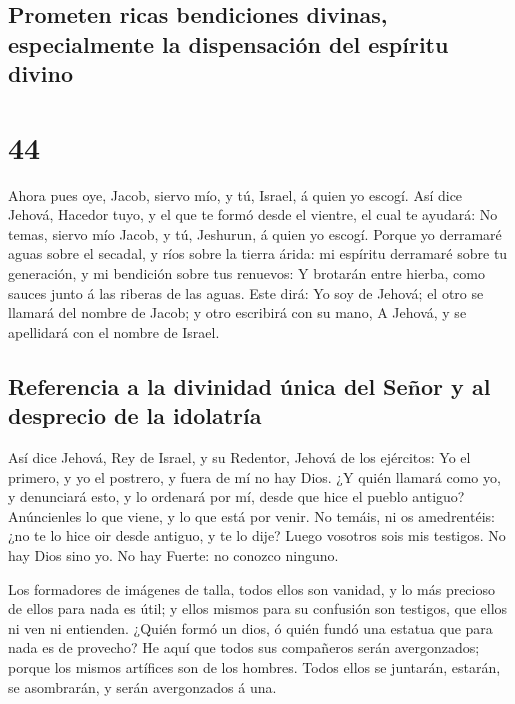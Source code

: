 \hypertarget{prometen-ricas-bendiciones-divinas-especialmente-la-dispensaciuxf3n-del-espuxedritu-divino}{%
\subsection{Prometen ricas bendiciones divinas, especialmente la
dispensación del espíritu
divino}\label{prometen-ricas-bendiciones-divinas-especialmente-la-dispensaciuxf3n-del-espuxedritu-divino}}

\hypertarget{section-43}{%
\section{44}\label{section-43}}

 Ahora pues oye, Jacob, siervo mío, y tú, Israel, á quien yo
escogí.  Así dice Jehová, Hacedor tuyo, y el que te formó
desde el vientre, el cual te ayudará: No temas, siervo mío Jacob, y tú,
Jeshurun, á quien yo escogí.  Porque yo derramaré aguas
sobre el secadal, y ríos sobre la tierra árida: mi espíritu derramaré
sobre tu generación, y mi bendición sobre tus renuevos:  Y
brotarán entre hierba, como sauces junto á las riberas de las aguas.
 Este dirá: Yo soy de Jehová; el otro se llamará del nombre
de Jacob; y otro escribirá con su mano, A Jehová, y se apellidará con el
nombre de Israel.

\hypertarget{referencia-a-la-divinidad-uxfanica-del-seuxf1or-y-al-desprecio-de-la-idolatruxeda}{%
\subsection{Referencia a la divinidad única del Señor y al desprecio de
la
idolatría}\label{referencia-a-la-divinidad-uxfanica-del-seuxf1or-y-al-desprecio-de-la-idolatruxeda}}

 Así dice Jehová, Rey de Israel, y su Redentor, Jehová de
los ejércitos: Yo el primero, y yo el postrero, y fuera de mí no hay
Dios.  ¿Y quién llamará como yo, y denunciará esto, y lo
ordenará por mí, desde que hice el pueblo antiguo? Anúncienles lo que
viene, y lo que está por venir.  No temáis, ni os
amedrentéis: ¿no te lo hice oir desde antiguo, y te lo dije? Luego
vosotros sois mis testigos. No hay Dios sino yo. No hay Fuerte: no
conozco ninguno.

 Los formadores de imágenes de talla, todos ellos son
vanidad, y lo más precioso de ellos para nada es útil; y ellos mismos
para su confusión son testigos, que ellos ni ven ni entienden.
 ¿Quién formó un dios, ó quién fundó una estatua que para
nada es de provecho?  He aquí que todos sus compañeros
serán avergonzados; porque los mismos artífices son de los hombres.
Todos ellos se juntarán, estarán, se asombrarán, y serán avergonzados á
una.

